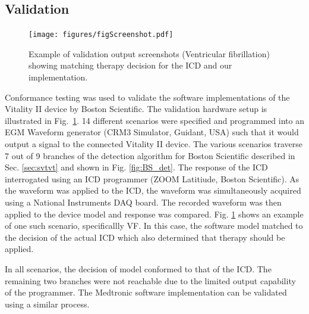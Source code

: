 \subsection{Validation}
\label{sec:validation}

\begin{figure}[t]
	\centering
	\texttt{[image: figures/figScreenshot.pdf]}
	\caption{\small Example of validation output screenshots (Ventricular fibrillation) showing matching therapy decision for the ICD and our implementation.}
	\label{fig:validation}
\end{figure}

Conformance testing was used to validate the software implementations of the Vitality II device by Boston Scientific. 
The validation hardware setup is illustrated in Fig.~\ref{fig:validation}. 
14 different scenarios were specified and programmed into an EGM Waveform generator (CRM3 Simulator, Guidant, USA) such that it would output a signal to the connected Vitality II device.
The various scenarios traverse 7 out of 9 branches of the detection algorithm for Boston Scientific described in Sec. \ref{sec:svtvt} and shown in Fig. \ref{fig:BS_det}. 
The response of the ICD interrogated using an ICD programmer (ZOOM Latitiude, Boston Scientific).
As the waveform was applied to the ICD, the waveform was simultaneously acquired using a National Instruments DAQ board.
The recorded waveform was then applied to the device model and response was compared.
Fig. \ref{fig:validation} shows an example of one such scenario, specificallly VF. 
In this case, the software model matched to the decision of the actual ICD which also determined that therapy should be applied.

In all scenarios, the decision of model conformed to that of the ICD. 
The remaining two branches were not reachable due to the limited output capability of the programmer.
The Medtronic software implementation can be validated using a similar process.

